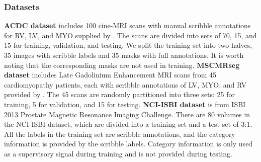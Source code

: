\documentclass[sigconf,natbib=false]{acmart}
\begin{document}
\subsubsection{Datasets}
\textbf{ACDC dataset} \cite{acdc} includes 100 cine-MRI scans with manual scribble annotations for RV, LV, and MYO supplied by \cite{MAAG}. The scans are divided into sets of 70, 15, and 15 for training, validation, and testing. We split the training set into two halves, 35 images with scribble labels and 35 masks with full annotations. It is worth noting that the corresponding masks are not used in training. \textbf{MSCMRseg dataset} \cite{mscmr1, mscmr2} includes Late Gadolinium Enhancement MRI scans from 45 cardiomyopathy patients, each with scribble annotations of LV, MYO, and RV provided by \cite{Zhang_2022_CycleMix}. The 45 scans are randomly partitioned into three sets: 25 for training, 5 for validation, and 15 for testing. \textbf{NCI-ISBI dataset} \cite{Clark2013Cancer} is from ISBI 2013 Prostate Magnetic Resonance Imaging Challenge. There are 80 volumes in the NCI-ISBI dataset, which are divided into a training set and a test set of 3:1. All the labels in the training set are scribble annotations, and the category information is provided by the scribble labels. Category information is only used as a supervisory signal during training and is not provided during testing.
\end{document}
